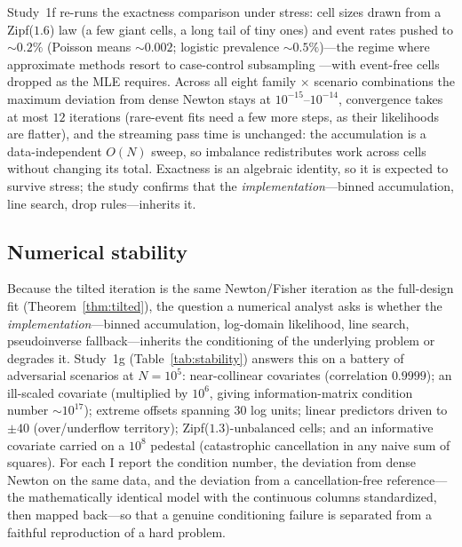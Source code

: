 \documentclass[11pt]{article}
\begin{document}
Study~1f re-runs the exactness comparison under stress: cell sizes drawn
from a Zipf($1.6$) law (a few giant cells, a long tail of tiny ones) and
event rates pushed to $\sim\!0.2\%$ (Poisson means $\sim\!0.002$; logistic
prevalence $\sim\!0.5\%$)---the regime where approximate methods resort
to case-control subsampling \citep{fithian2014}---with event-free cells
dropped as the MLE requires.  Across all eight family $\times$ scenario combinations the
maximum deviation from dense Newton stays at $10^{-15}$--$10^{-14}$,
convergence takes at most $12$ iterations (rare-event fits need a few
more steps, as their likelihoods are flatter), and the streaming pass
time is unchanged: the accumulation is a data-independent $O(N)$ sweep,
so imbalance redistributes work across cells without changing its total.
Exactness is an algebraic identity, so it is expected to survive stress;
the study confirms that the \emph{implementation}---binned accumulation,
line search, drop rules---inherits it.

\subsection{Numerical stability}\label{sec:sim-stability}

Because the tilted iteration is the same Newton/Fisher iteration as the
full-design fit (Theorem~\ref{thm:tilted}), the question a numerical
analyst asks is whether the \emph{implementation}---binned accumulation,
log-domain likelihood, line search, pseudoinverse fallback---inherits the
conditioning of the underlying problem or degrades it.  Study~1g
(Table~\ref{tab:stability}) answers this on a battery of adversarial
scenarios at $N = 10^5$: near-collinear covariates (correlation
$0.9999$); an ill-scaled covariate (multiplied by $10^6$, giving
information-matrix condition number $\sim\!10^{17}$); extreme offsets
spanning $30$ log units; linear predictors driven to $\pm 40$
(over/underflow territory); Zipf($1.3$)-unbalanced cells; and an
informative covariate carried on a $10^8$ pedestal (catastrophic
cancellation in any naive sum of squares).  For each I report the
condition number, the deviation from dense Newton on the same data, and
the deviation from a cancellation-free reference---the mathematically
identical model with the continuous columns standardized, then mapped
back---so that a genuine conditioning failure is separated from a faithful
reproduction of a hard problem.
\end{document}
